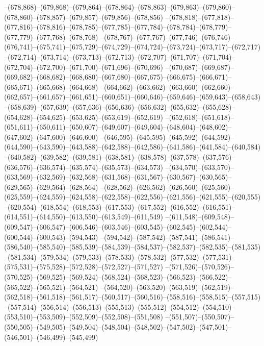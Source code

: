 --(678,868)--(679,868)--(679,864)--(678,864)--(678,863)--(679,863)--(679,860)--(678,860)--(678,857)--(679,857)--(679,856)--(678,856)
--(678,818)--(677,818)--(677,816)--(678,816)--(678,785)--(677,785)--(677,784)--(678,784)--(678,779)--(677,779)--(677,768)--(678,768)
--(678,767)--(677,767)--(677,746)--(676,746)--(676,741)--(675,741)--(675,729)--(674,729)--(674,724)--(673,724)--(673,717)--(672,717)
--(672,714)--(673,714)--(673,713)--(672,713)--(672,707)--(671,707)--(671,704)--(672,704)--(672,700)--(671,700)--(671,696)--(670,696)
--(670,687)--(669,687)--(669,682)--(668,682)--(668,680)--(667,680)--(667,675)--(666,675)--(666,671)--(665,671)--(665,668)--(664,668)
--(664,662)--(663,662)--(663,660)--(662,660)--(662,657)--(661,657)--(661,651)--(660,651)--(660,646)--(659,646)--(659,643)--(658,643)
--(658,639)--(657,639)--(657,636)--(656,636)--(656,632)--(655,632)--(655,628)--(654,628)--(654,625)--(653,625)--(653,619)--(652,619)
--(652,618)--(651,618)--(651,611)--(650,611)--(650,607)--(649,607)--(649,604)--(648,604)--(648,602)--(647,602)--(647,600)--(646,600)
--(646,595)--(645,595)--(645,592)--(644,592)--(644,590)--(643,590)--(643,588)--(642,588)--(642,586)--(641,586)--(641,584)--(640,584)
--(640,582)--(639,582)--(639,581)--(638,581)--(638,578)--(637,578)--(637,576)--(636,576)--(636,574)--(635,574)--(635,573)--(634,573)
--(634,570)--(633,570)--(633,569)--(632,569)--(632,568)--(631,568)--(631,567)--(630,567)--(630,565)--(629,565)--(629,564)--(628,564)
--(628,562)--(626,562)--(626,560)--(625,560)--(625,559)--(624,559)--(624,558)--(622,558)--(622,556)--(621,556)--(621,555)--(620,555)
--(620,554)--(618,554)--(618,553)--(617,553)--(617,552)--(616,552)--(616,551)--(614,551)--(614,550)--(613,550)--(613,549)--(611,549)
--(611,548)--(609,548)--(609,547)--(606,547)--(606,546)--(603,546)--(603,545)--(602,545)--(602,544)--(600,544)--(600,543)--(594,543)
--(594,542)--(587,542)--(587,541)--(586,541)--(586,540)--(585,540)--(585,539)--(584,539)--(584,537)--(582,537)--(582,535)--(581,535)
--(581,534)--(579,534)--(579,533)--(578,533)--(578,532)--(577,532)--(577,531)--(575,531)--(575,528)--(572,528)--(572,527)--(571,527)
--(571,526)--(570,526)--(570,525)--(569,525)--(569,524)--(568,524)--(568,523)--(566,523)--(566,522)--(565,522)--(565,521)--(564,521)
--(564,520)--(563,520)--(563,519)--(562,519)--(562,518)--(561,518)--(561,517)--(560,517)--(560,516)--(558,516)--(558,515)--(557,515)
--(557,514)--(556,514)--(556,513)--(555,513)--(555,512)--(554,512)--(554,510)--(553,510)--(553,509)--(552,509)--(552,508)--(551,508)
--(551,507)--(550,507)--(550,505)--(549,505)--(549,504)--(548,504)--(548,502)--(547,502)--(547,501)--(546,501)--(546,499)--(545,499)
